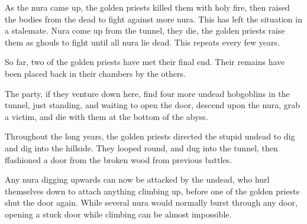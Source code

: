 \begin{multicols}{2}
\begin{exampletext}
As the nura came up, the golden priests killed them with holy fire, then raised the bodies from the dead to fight against more nura.  This has left the situation in a stalemate.  Nura come up from the tunnel, they die, the golden priests raise them as ghouls to fight until all nura lie dead.  This repeats every few years.

So far, two of the golden priests have met their final end.  Their remains have been placed back in their chambers by the others.

\end{exampletext}


The party, if they venture down here, find four more undead hobgoblins in the tunnel, just standing, and waiting to open the door, descend upon the nura, grab a victim, and die with them at the bottom of the abyss.

\begin{exampletext}

	Throughout the long years, the golden priests directed the stupid undead to dig and dig into the hillside.
	They looped round, and dug into the tunnel, then ffashioned a door from the broken wood from previous battles.

Any nura digging upwards can now be attacked by the undead, who hurl themselves down to attach anything climbing up, before one of the golden priests shut the door again.
While several nura would normally burst through any door, opening a stuck door while climbing can be almost impossible.

\end{exampletext}

\end{multicols}

